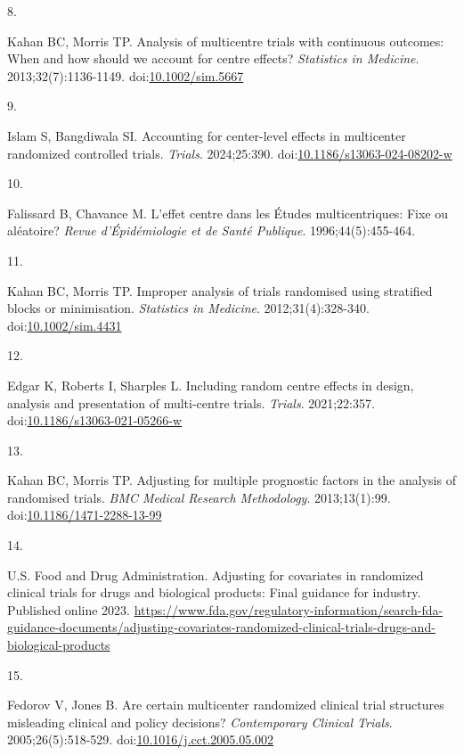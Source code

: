 \documentclass[
  11pt,
]{article}
\newlength{\cslhangindent}
\newlength{\csllabelwidth}
\newenvironment{CSLReferences}[2] %
 {\begin{list}{}{%
  \setlength{\itemindent}{0pt}
  \setlength{\leftmargin}{0pt}
  \setlength{\parsep}{0pt}
  \ifodd #1
   \setlength{\leftmargin}{\cslhangindent}
   \setlength{\itemindent}{-1\cslhangindent}
  \fi
  \setlength{\itemsep}{#2\baselineskip}}}
 {\end{list}}
\newcommand{\CSLLeftMargin}[1]{\parbox[t]{\csllabelwidth}{\strut#1\strut}}
\newcommand{\CSLRightInline}[1]{\parbox[t]{\linewidth - \csllabelwidth}{\strut#1\strut}}
\begin{document}
\begin{CSLReferences}{0}{1}
\CSLLeftMargin{8. }%
\CSLRightInline{Kahan BC, Morris TP. Analysis of multicentre trials with continuous outcomes: When and how should we account for centre effects? \emph{Statistics in Medicine}. 2013;32(7):1136-1149. doi:\href{https://doi.org/10.1002/sim.5667}{10.1002/sim.5667}}

\CSLLeftMargin{9. }%
\CSLRightInline{Islam S, Bangdiwala SI. Accounting for center-level effects in multicenter randomized controlled trials. \emph{Trials}. 2024;25:390. doi:\href{https://doi.org/10.1186/s13063-024-08202-w}{10.1186/s13063-024-08202-w}}

\CSLLeftMargin{10. }%
\CSLRightInline{Falissard B, Chavance M. L'effet centre dans les {É}tudes multicentriques: Fixe ou al{é}atoire? \emph{Revue d'{É}pid{é}miologie et de Sant{é} Publique}. 1996;44(5):455-464.}

\CSLLeftMargin{11. }%
\CSLRightInline{Kahan BC, Morris TP. Improper analysis of trials randomised using stratified blocks or minimisation. \emph{Statistics in Medicine}. 2012;31(4):328-340. doi:\href{https://doi.org/10.1002/sim.4431}{10.1002/sim.4431}}

\CSLLeftMargin{12. }%
\CSLRightInline{Edgar K, Roberts I, Sharples L. Including random centre effects in design, analysis and presentation of multi-centre trials. \emph{Trials}. 2021;22:357. doi:\href{https://doi.org/10.1186/s13063-021-05266-w}{10.1186/s13063-021-05266-w}}

\CSLLeftMargin{13. }%
\CSLRightInline{Kahan BC, Morris TP. Adjusting for multiple prognostic factors in the analysis of randomised trials. \emph{BMC Medical Research Methodology}. 2013;13(1):99. doi:\href{https://doi.org/10.1186/1471-2288-13-99}{10.1186/1471-2288-13-99}}

\CSLLeftMargin{14. }%
\CSLRightInline{U.S. Food and Drug Administration. Adjusting for covariates in randomized clinical trials for drugs and biological products: Final guidance for industry. Published online 2023. \url{https://www.fda.gov/regulatory-information/search-fda-guidance-documents/adjusting-covariates-randomized-clinical-trials-drugs-and-biological-products}}

\CSLLeftMargin{15. }%
\CSLRightInline{Fedorov V, Jones B. Are certain multicenter randomized clinical trial structures misleading clinical and policy decisions? \emph{Contemporary Clinical Trials}. 2005;26(5):518-529. doi:\href{https://doi.org/10.1016/j.cct.2005.05.002}{10.1016/j.cct.2005.05.002}}


\end{CSLReferences}
\end{document}
